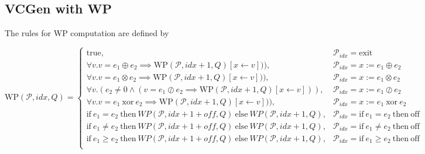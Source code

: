 \subsection{VCGen with WP}
\label{subsec:vcgen_wp}

The rules for WP computation are defined by


\[
  \mathrm{WP}(\mathcal{P}, idx, Q) =
  \begin{cases}
    \mathrm{true}, & \mathcal{P}_{idx} = \mathrm{exit} \\
    \forall v . v = e_1 \oplus e_2 \implies \mathrm{WP}(\mathcal{P}, idx+1, Q)[x \leftarrow v])) , & \mathcal{P}_{idx} = x := e_1 \oplus e_2 \\
    \forall v . v = e_1 \otimes e_2 \implies \mathrm{WP}(\mathcal{P}, idx+1, Q)[x \leftarrow v])) , & \mathcal{P}_{idx} = x := e_1 \otimes e_2 \\    
    \forall v . (e_2  \neq 0 \land (v = e_1 \oslash e_2 \implies \mathrm{WP}(\mathcal{P}, idx+1, Q)[x \leftarrow v])) , & \mathcal{P}_{idx} = x := e_1 \oslash e_2 \\
    \forall v . v = e_1 ~ \mathrm{xor} ~ e_2 \implies \mathrm{WP}(\mathcal{P}, idx+1, Q)[x \leftarrow v])) , & \mathcal{P}_{idx} = x := e_1 ~ \mathrm{xor} ~ e_2 \\
    \mathrm{if} ~ e_1 = e_2 ~ \mathrm{then} ~ WP(\mathcal{P}, idx+1+off, Q) ~ \mathrm{else} ~ WP(\mathcal{P},idx+1, Q) , & \mathcal{P}_{idx} = \mathrm{if} ~ e_1 = e_2 ~ \mathrm{then} ~ \mathrm{off} \\
    \mathrm{if} ~ e_1 \neq e_2 ~ \mathrm{then} ~ WP(\mathcal{P}, idx+1+off, Q) ~ \mathrm{else} ~ WP(\mathcal{P},idx+1, Q) , & \mathcal{P}_{idx} = \mathrm{if} ~ e_1 \neq e_2 ~ \mathrm{then} ~ \mathrm{off} \\    
    \mathrm{if} ~ e_1 \geq e_2 ~ \mathrm{then} ~ WP(\mathcal{P}, idx+1+off, Q) ~ \mathrm{else} ~ WP(\mathcal{P},idx+1, Q) , & \mathcal{P}_{idx} = \mathrm{if} ~ e_1 \geq e_2 ~ \mathrm{then} ~ \mathrm{off} \\    \end{cases}
\]









